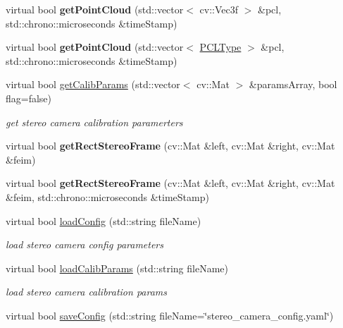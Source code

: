 \begin{DoxyCompactItemize}
\mbox{\label{class_stereo_camera_aed61a02ac44c99be0aa62afea2ad9ed8}} 
virtual bool {\bfseries get\+Point\+Cloud} (std\+::vector$<$ cv\+::\+Vec3f $>$ \&pcl, std\+::chrono\+::microseconds \&time\+Stamp)
\item 
\mbox{\label{class_stereo_camera_ac571ca8f4dc4783052bdab22f68a1ac1}} 
virtual bool {\bfseries get\+Point\+Cloud} (std\+::vector$<$ \hyperlink{struct_p_c_l}{P\+C\+L\+Type} $>$ \&pcl, std\+::chrono\+::microseconds \&time\+Stamp)
\item 
virtual bool \hyperlink{class_stereo_camera_a61ea11e661cca31acb780edbbba1d32e}{get\+Calib\+Params} (std\+::vector$<$ cv\+::\+Mat $>$ \&params\+Array, bool flag=false)
\begin{DoxyCompactList}\small\item\em get stereo camera calibration paramerters \end{DoxyCompactList}\item 
\mbox{\label{class_stereo_camera_a6a2a8d258ad08a80ab02932d5248850e}} 
virtual bool {\bfseries get\+Rect\+Stereo\+Frame} (cv\+::\+Mat \&left, cv\+::\+Mat \&right, cv\+::\+Mat \&feim)
\item 
\mbox{\label{class_stereo_camera_a2730d460983ce6af37a4cf13025b4ed8}} 
virtual bool {\bfseries get\+Rect\+Stereo\+Frame} (cv\+::\+Mat \&left, cv\+::\+Mat \&right, cv\+::\+Mat \&feim, std\+::chrono\+::microseconds \&time\+Stamp)
\item 
virtual bool \hyperlink{class_stereo_camera_afe25245d518e12c6f0a685d7da7a2979}{load\+Config} (std\+::string file\+Name)
\begin{DoxyCompactList}\small\item\em load stereo camera config parameters \end{DoxyCompactList}\item 
virtual bool \hyperlink{class_stereo_camera_afb896942fb7fe1ea33c80ec9dcefa6a0}{load\+Calib\+Params} (std\+::string file\+Name)
\begin{DoxyCompactList}\small\item\em load stereo camera calibration params \end{DoxyCompactList}\item 
virtual bool \hyperlink{class_stereo_camera_a568930e8b3668361fedad5233ab5ba47}{save\+Config} (std\+::string file\+Name=\char`\"{}stereo\+\_\+camera\+\_\+config.\+yaml\char`\"{})

\end{DoxyCompactItemize}
